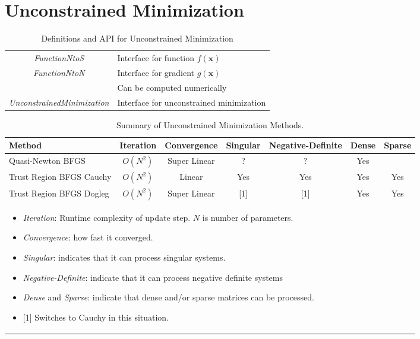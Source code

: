 \documentclass[peerreview,compsoc,onecolumn]{IEEEtran}
\begin{document}
\section{Unconstrained Minimization}

\begin{table}[h]
\centering
\caption{\label{definitions:UM}Definitions and API for Unconstrained Minimization}
\begin{tabular}{cl}
\textit{FunctionNtoS} & Interface for function $f(\bm{x})$ \\
\textit{FunctionNtoN} & Interface for gradient $g(\bm{x})$ \\
& Can be computed numerically \\
\textit{UnconstrainedMinimization} & Interface for unconstrained minimization
\end{tabular}
\end{table}

\begin{table}[h]
\caption{\label{summary:UM}Summary of Unconstrained Minimization Methods.}
\centering
\begin{tabular}{lcccccc}
Method & Iteration & Convergence & Singular & Negative-Definite & Dense & Sparse \\[1ex]
\hline
Quasi-Newton BFGS        & $O(N^2)$ & Super Linear & ?   & ?   & Yes &  \rule{0pt}{2.6ex} \\
Trust Region BFGS Cauchy & $O(N^2)$ & Linear       & Yes & Yes & Yes & Yes  \\
Trust Region BFGS Dogleg & $O(N^2)$ & Super Linear & [1] & [1] & Yes & Yes  \\[1ex]
\hline
\multicolumn{6}{l}{
\begin{minipage}{0.6\textwidth}
\centering
\vspace{2mm}
\begin{itemize}[leftmargin=*]
\item \emph{Iteration}: Runtime complexity of update step. $N$ is number of parameters.
\item \emph{Convergence}: how fast it converged.
\item \emph{Singular}: indicates that it can process singular systems.
\item \emph{Negative-Definite}: indicate that it can process negative definite systems
\item \emph{Dense} and \emph{Sparse}: indicate that dense and/or sparse matrices can be processed. 
\item {[1]} Switches to Cauchy in this situation.
\end{itemize}
\end{minipage}
 }
\end{tabular}
\end{table}
\end{document}
